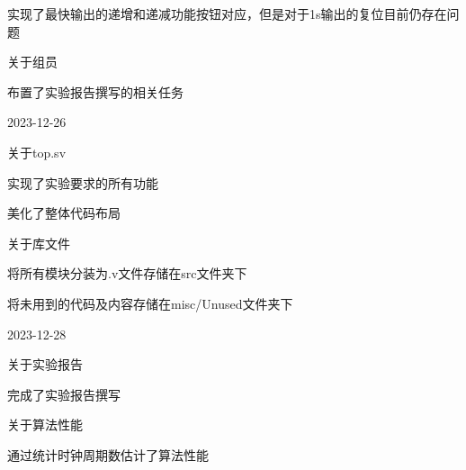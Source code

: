 \begin{compactitem}
\begin{compactitem}
\begin{compactitem}
			\item 实现了最快输出的递增和递减功能按钮对应，但是对于1s输出的复位目前仍存在问题
		\end{compactitem}
		\item 关于组员
		\begin{compactitem}
			\item 布置了实验报告撰写的相关任务
		\end{compactitem}
	\end{compactitem}
	\item 2023-12-26
	\begin{compactitem}
		\item 关于top.sv
		\begin{compactitem}
			\item 实现了实验要求的所有功能
			\item 美化了整体代码布局
		\end{compactitem}
		\item 关于库文件
		\begin{compactitem}
			\item 将所有模块分装为.v文件存储在src文件夹下
			\item 将未用到的代码及内容存储在misc/Unused文件夹下
		\end{compactitem}
	\end{compactitem}
	\item 2023-12-28
	\begin{compactitem}
		\item 关于实验报告
		\begin{compactitem}
			\item 完成了实验报告撰写
		\end{compactitem}
		\item 关于算法性能
		\begin{compactitem}
			\item 通过统计时钟周期数估计了算法性能
		\end{compactitem}
	\end{compactitem}
\end{compactitem}






\ifx\allfiles\undefined

\else
\fi

